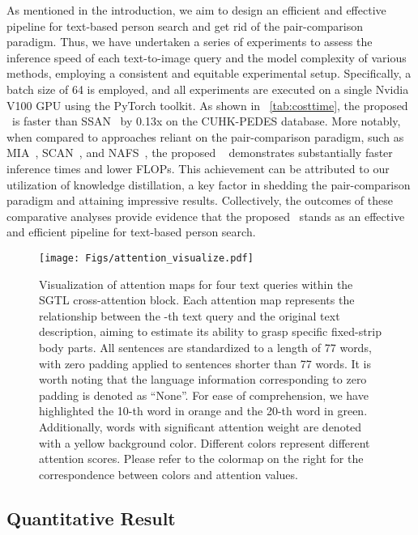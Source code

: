 As mentioned in the introduction, we aim to design an efficient and effective pipeline for text-based person search and get rid of the pair-comparison paradigm. Thus, we have undertaken a series of experiments to assess the inference speed of each text-to-image query and the model complexity of various methods, employing a consistent and equitable experimental setup. Specifically, a batch size of 64 is employed, and all experiments are executed on a single Nvidia V100 GPU using the PyTorch toolkit. 
As shown in \tablename~\ref{tab:costtime}, the proposed \ourmodel~is faster than SSAN~\cite{ssan} by 0.13x on the CUHK-PEDES database. More notably, when compared to approaches reliant on the pair-comparison paradigm, such as MIA~\cite{niu2020mia}, SCAN~\cite{lee2018stacked}, and NAFS~\cite{gao2021contextual}, the proposed \ourmodel~ demonstrates substantially faster inference times and lower FLOPs. This achievement can be attributed to our utilization of knowledge distillation, a key factor in shedding the pair-comparison paradigm and attaining impressive results.
Collectively, the outcomes of these comparative analyses provide evidence that the proposed \ourmodel~stands as an effective and efficient pipeline for text-based person search.



\begin{figure*}[t]
	\centering
	\texttt{[image: Figs/attention\_visualize.pdf]}
	\caption{\small{Visualization of attention maps for four text queries within the SGTL cross-attention block. Each attention map represents the relationship between the -th text query and the original text description, aiming to estimate its ability to grasp specific fixed-strip body parts. All sentences are standardized to a length of 77 words, with zero padding applied to sentences shorter than 77 words. 
    It is worth noting that the language information corresponding to zero padding is denoted as ``None''. For ease of comprehension, we have highlighted the 10-th word in orange and the 20-th word in green.
Additionally, words with significant attention weight are denoted with a yellow background color.
 Different colors represent different attention scores. Please refer to the colormap on the right for the correspondence between colors and attention values.
}}\label{fig:attention_visualize}
\end{figure*}

\subsection{Quantitative Result}

